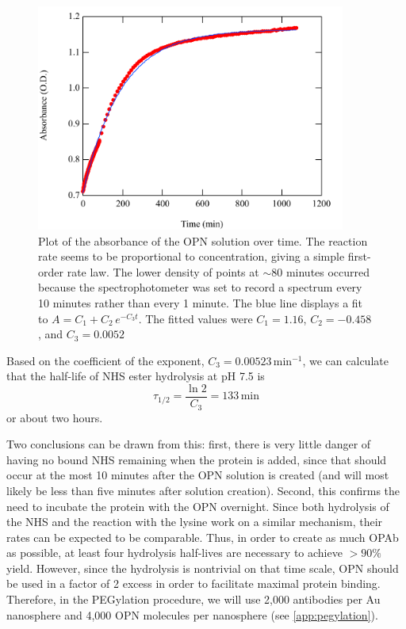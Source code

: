 \begin{figure}[htbp]
\centering
\includegraphics[keepaspectratio,width=4in,height=0.75\textheight]{NHShydro.pdf}
\caption{Plot of the absorbance of the OPN solution over time. The reaction rate seems to be proportional to concentration, giving a simple first-order rate law. The lower density of points at \ensuremath{\sim}80 minutes occurred because the spectrophotometer was set to record a spectrum every 10 minutes rather than every 1 minute. The blue line displays a fit to $A = C_1 + C_2\, e^{-C_3 t}$. The fitted values were $C_1=1.16$, $C_2=-0.458$, and $C_3=0.0052$}
\label{nmabsorption}
\end{figure}



Based on the coefficient of the exponent, $C_3=0.00523\,\mathrm{min^{-1}}$, we can calculate that the half-life of NHS ester hydrolysis at pH 7.5 is \[\tau_{1/2}=\frac{\ln 2}{C_3} = 133\mathrm{\,min}\]
or about two hours.

Two conclusions can be drawn from this: first, there is very little danger of having no bound NHS remaining when the protein is added, since that should occur at the most 10 minutes after the OPN solution is created (and will most likely be less than five minutes after solution creation). Second, this confirms the need to incubate the protein with the OPN overnight. Since both hydrolysis of the NHS and the reaction with the lysine work on a similar mechanism, their rates can be expected to be comparable. Thus, in order to create as much OPAb as possible, at least four hydrolysis half-lives are necessary to achieve $>90\%$ yield. However, since the hydrolysis is nontrivial on that time scale, OPN should be used in a factor of 2 excess in order to facilitate maximal protein binding. Therefore, in the PEGylation procedure, we will use 2,000 antibodies per Au nanosphere and 4,000 OPN molecules per nanosphere (see \autoref{app:pegylation}).
